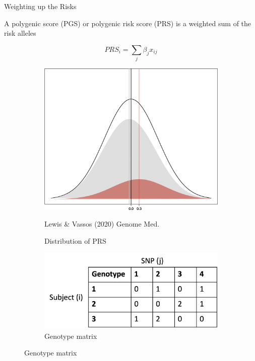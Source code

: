 \documentclass{beamer}
\begin{document}
\begin{frame}{Weighting up the Risks}

A polygenic score (PGS) or polygenic risk score (PRS) is a weighted sum of the risk alleles

\begin{equation}
    PRS_i=\sum_{j}\beta_j x_{ij}
\end{equation}

\begin{figure}
\centering
\begin{subfigure}{.5\textwidth}
  \centering
  \includegraphics[width=.7\linewidth]{images/PRS_distribution.png}
  \caption{Distribution of PRS}
  \label{fig:distribution}
              {\tiny Lewis \& Vassos (2020) Genome Med.}
\end{subfigure}%
\begin{subfigure}{.5\textwidth}
  \centering
  \includegraphics[width=.7\linewidth]{images/Genotype.png}
  \caption{Genotype matrix}
  \label{fig:genotype}
\end{subfigure}
\label{fig:}
\end{figure}

    
\end{frame}
\end{document}
